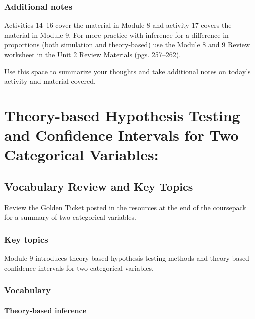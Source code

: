 \documentclass[
]{report}
\begin{document}
\subsection{Additional notes}\label{additional-notes-15}

Activities 14--16 cover the material in Module 8 and activity 17 covers the material in Module 9. For more practice with inference for a difference in proportions (both simulation and theory-based) use the Module 8 and 9 Review worksheet in the Unit 2 Review Materials (pgs. 257--262).

Use this space to summarize your thoughts and take additional notes on today's activity and material covered.

\newpage

\chapter{Theory-based Hypothesis Testing and Confidence Intervals for Two Categorical Variables:}\label{theory-based-hypothesis-testing-and-confidence-intervals-for-two-categorical-variables}

\section{Vocabulary Review and Key Topics}\label{vocabulary-review-and-key-topics-7}

Review the Golden Ticket posted in the resources at the end of the coursepack for a summary of two categorical variables.

\subsection{Key topics}\label{key-topics-8}

Module 9 introduces theory-based hypothesis testing methods and theory-based confidence intervals for two categorical variables.

\subsection{Vocabulary}\label{vocabulary-7}

\subsubsection*{Theory-based inference}\label{theory-based-inference}
\end{document}
